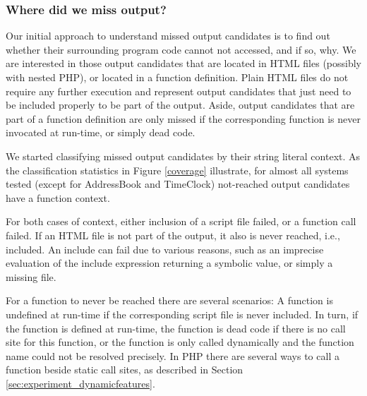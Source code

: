 \documentclass[sigconf, preprint]{acmart}
\begin{document}
\subsubsection{Where did we miss output?}\label{WhatLiteralsDidWeMiss?}
Our initial approach to understand missed output candidates is to find out
whether their surrounding program code cannot not accessed, and if
so, why. We are interested in those output candidates that are located in HTML
files (possibly with nested PHP), or located in a function definition. Plain
HTML files do not require any further execution and represent output candidates
that just need to be included properly to be part of the output. Aside, output
candidates that are part of a function definition are only missed if the
corresponding function is never invocated at run-time, or simply dead code.

We started classifying missed output candidates by their string literal
context. As the classification statistics in Figure \ref{coverage} illustrate,
for almost all systems tested (except for \textsf{AddressBook} and
\textsf{TimeClock}) not-reached output candidates have a function context. 


For both cases of context, either inclusion of a script file failed, or a
function call failed. If an HTML file is not part of the output, it also is
never reached, i.e., included. An include can fail due to various reasons, such
as an imprecise evaluation of the include expression returning a symbolic
value, or simply a missing file.

For a function to never be reached there are several scenarios: A function is
undefined at run-time if the corresponding script file is never included. In
turn, if the function is defined at run-time, the function is dead
code if there is no call site for this function, or the function is only called
dynamically and the function name could not be resolved precisely. In PHP there
are several ways to call a function beside static call sites, as described in
Section \ref{sec:experiment_dynamicfeatures}.
\end{document}
